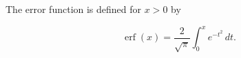 The error function is defined for $x > 0$ by

$$\operatorname{erf}(x) = \frac{2}{\sqrt{\pi}} \int_{0}^{x} e^{-t^2} \, dt.$$
